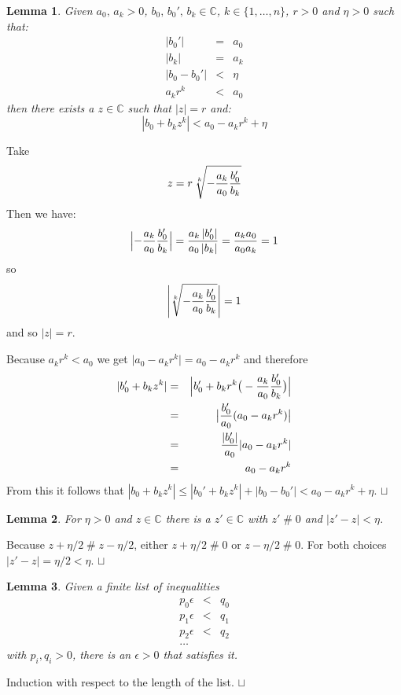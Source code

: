\documentclass{article}
\def\CC{\mathbb{C}}
\newtheorem{lemma}{Lemma}
\newenvironment{proof}{\trivlist \item[\hskip \labelsep{\bf Proof$\,$}]}{\hfill\rlap{$\sqcap$}$\sqcup$\par}
\begin{document}
\begin{lemma}\label{lemma:est3}
Given $a_0,\,a_k > 0$, $b_0,\,b_0',\,b_k\in\CC$, $k\in\{1,\ldots,n\}$, $r > 0$ and $\eta > 0$
such that:
\begin{eqnarray*}
|b_0'| &=& a_0 \\
|b_k| &=& a_k \\
|b_0 - b_0'| &<& \eta\\
a_k r^k &<& a_0
\end{eqnarray*}
then there exists a $z\in\CC$ such that $|z| = r$ and:
$$\left|b_0 + b_k z^k\right| < a_0 - a_k r^k + \eta$$
\end{lemma}
\begin{proof}
Take
$$z = r\,\root k\of{-{a_k\over a_0}{b_0'\over b_k}}$$
Then we have:
$$\Big|{-{a_k\over a_0}{b_0'\over b_k}}\Big| = {a_k\left|b_0'\right|\over a_0\left|b_k\right|}
= {a_k a_0\over a_0 a_k} = 1$$
so
$$\Bigg|\root k\of{-{a_k\over a_0}{b_0'\over b_k}}\Bigg| = 1$$
and so $|z| = r$.

Because $a_k r^k < a_0$ we get $\big|a_0 - a_k r^k\big| = a_0 - a_k r^k$ and therefore
\begin{eqnarray*}
|b_0' + b_k z^k| &=& \Big|b_0' + b_k r^k \big(-{a_k\over a_0}{b_0'\over b_k}\big)\Big|\\
&=& \big|{b_0'\over a_0}(a_0 - a_k r^k)\big|\\
&=& {|b_0'|\over a_0}|a_0 - a_k r^k|\\
&=& a_0 - a_k r^k
\end{eqnarray*}
From this it follows that
$\left|b_0 + b_k z^k\right| \le \left|b_0' + b_k z^k\right| + |b_0 - b_0'| < a_0 - a_k r^k + \eta$.
\end{proof}

\begin{lemma}\label{lemma:nzc}
For $\eta > 0$ and $z\in\CC$ there is a $z'\in\CC$ with $z' \mathrel{\#} 0$ and $|z' - z| < \eta$.
\end{lemma}
\begin{proof}
Because $z + \eta/2 \mathrel{\#} z - \eta/2$, either $z + \eta/2 \mathrel{\#} 0$ or
$z - \eta/2 \mathrel{\#} 0$.  For both choices $|z' - z| = \eta/2 < \eta$.
\end{proof}

\begin{lemma}\label{lemma:eps0}
Given a finite list of inequalities
\begin{eqnarray*}
p_0\epsilon &<& q_0\\
p_1\epsilon &<& q_1\\
p_2\epsilon &<& q_2\\
\ldots
\end{eqnarray*}
with $p_i,q_i > 0$, there is an $\epsilon > 0$ that satisfies it.
\end{lemma}
\begin{proof}
Induction with respect to the length of the list.
\end{proof}
\end{document}
